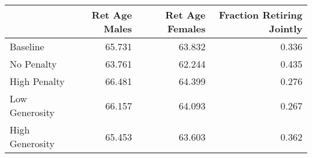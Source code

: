 \begin{tabular}{lrrr}
\toprule
{} & Ret Age Males & Ret Age Females & Fraction Retiring Jointly \\
\midrule
Baseline        &        65.731 &          63.832 &                     0.336 \\
No Penalty      &        63.761 &          62.244 &                     0.435 \\
High Penalty    &        66.481 &          64.399 &                     0.276 \\
Low Generosity  &        66.157 &          64.093 &                     0.267 \\
High Generosity &        65.453 &          63.603 &                     0.362 \\
\bottomrule
\end{tabular}
